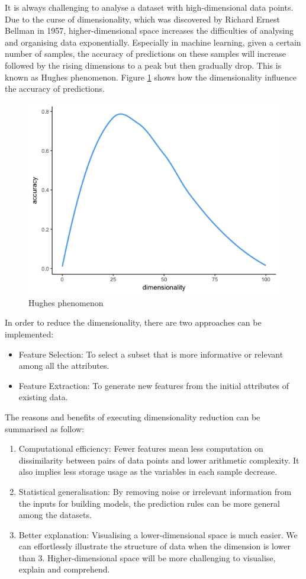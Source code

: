 \documentclass[11pt]{article} %
\theoremstyle{plain}
\theoremstyle{definition}
\begin{document}
It is always challenging to analyse a dataset with high-dimensional data points. Due to the curse of dimensionality, which was discovered by Richard Ernest Bellman in 1957, higher-dimensional space increases the difficulties of analysing and organising data exponentially\cite{keogh/cod:2017}. Especially in machine learning, given a certain number of samples, the accuracy of predictions on these samples will increase followed by the rising dimensions to a peak but then gradually drop. This is known as Hughes phenomenon\cite{hughes/itoit:1968}. Figure \ref{fig:hughes} shows how the dimensionality influence the accuracy of predictions.

\begin{figure}[ht]
  \includegraphics[width=0.8\linewidth, center]{resources/dimensionality.png}
  \caption{Hughes phenomenon}
  \label{fig:hughes}
\end{figure}

In order to reduce the dimensionality, there are two approaches can be implemented:
\begin{itemize}
  \item Feature Selection: To select a subset that is more informative or relevant among all the attributes\cite{hastie/etal:2009}.
  \item Feature Extraction: To generate new features from the initial attributes of existing data\cite{wiki/fs:2018}.
\end{itemize}

The reasons and benefits of executing dimensionality reduction can be summarised as follow:
\begin{enumerate}
  \item Computational efficiency: Fewer features mean less computation on dissimilarity between pairs of data points and lower arithmetic complexity. It also implies less storage usage as the variables in each sample decrease.
  \item Statistical generalisation: By removing noise or irrelevant information from the inputs for building models, the prediction rules can be more general among the datasets.
  \item Better explanation: Visualising a lower-dimensional space is much easier. We can effortlessly illustrate the structure of data when the dimension is lower than 3. Higher-dimensional space will be more challenging to visualise, explain and comprehend.
\end{enumerate}
\end{document}
